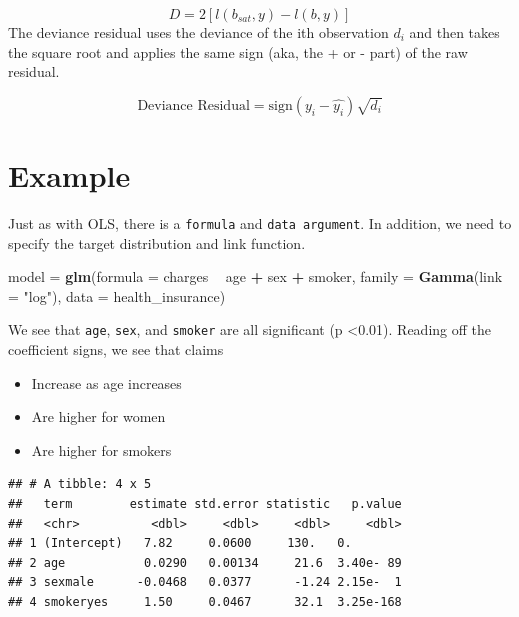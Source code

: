 \documentclass[openany]{book}
\newenvironment{Shaded}{\begin{snugshade}}{\end{snugshade}}
\newcommand{\DataTypeTok}[1]{\textcolor[rgb]{0.13,0.29,0.53}{#1}}
\newcommand{\KeywordTok}[1]{\textcolor[rgb]{0.13,0.29,0.53}{\textbf{#1}}}
\newcommand{\NormalTok}[1]{#1}
\newcommand{\OperatorTok}[1]{\textcolor[rgb]{0.81,0.36,0.00}{\textbf{#1}}}
\newcommand{\StringTok}[1]{\textcolor[rgb]{0.31,0.60,0.02}{#1}}
\providecommand{\tightlist}{%
  \setlength{\itemsep}{0pt}\setlength{\parskip}{0pt}}
\begin{document}
\[D = 2[l(b_{sat},y) - l(b,y)]\]
The deviance residual uses the deviance of the ith observation \(d_i\) and then takes the square root and applies the same sign (aka, the + or - part) of the raw residual.

\[\text{Deviance Residual} = \text{sign}(y_i - \hat{y_i})\sqrt{d_i}\]

\hypertarget{example-2}{%
\section{Example}\label{example-2}}

Just as with OLS, there is a \texttt{formula} and \texttt{data\ argument}. In addition, we need to specify the target distribution and link function.

\begin{Shaded}
\begin{Highlighting}[]
\NormalTok{model =}\StringTok{ }\KeywordTok{glm}\NormalTok{(}\DataTypeTok{formula =}\NormalTok{ charges }\OperatorTok{~}\StringTok{ }\NormalTok{age }\OperatorTok{+}\StringTok{ }\NormalTok{sex }\OperatorTok{+}\StringTok{ }\NormalTok{smoker, }
            \DataTypeTok{family =} \KeywordTok{Gamma}\NormalTok{(}\DataTypeTok{link =} \StringTok{"log"}\NormalTok{),}
            \DataTypeTok{data =}\NormalTok{ health_insurance)}
\end{Highlighting}
\end{Shaded}

We see that \texttt{age}, \texttt{sex}, and \texttt{smoker} are all significant (p \textless0.01). Reading off the coefficient signs, we see that claims

\begin{itemize}
\tightlist
\item
  Increase as age increases
\item
  Are higher for women
\item
  Are higher for smokers
\end{itemize}

\begin{Shaded}
\end{Shaded}

\begin{verbatim}
## # A tibble: 4 x 5
##   term        estimate std.error statistic   p.value
##   <chr>          <dbl>     <dbl>     <dbl>     <dbl>
## 1 (Intercept)   7.82     0.0600     130.   0.       
## 2 age           0.0290   0.00134     21.6  3.40e- 89
## 3 sexmale      -0.0468   0.0377      -1.24 2.15e-  1
## 4 smokeryes     1.50     0.0467      32.1  3.25e-168
\end{verbatim}
\end{document}
